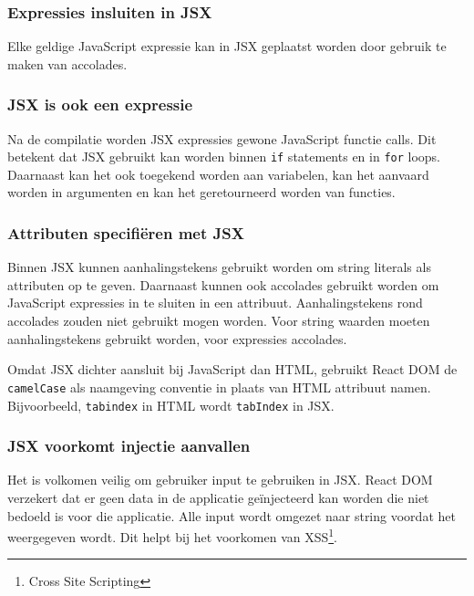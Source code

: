 \subsubsection{Expressies insluiten in JSX}

Elke geldige JavaScript expressie kan in JSX geplaatst worden door gebruik te maken van accolades. \autocite{React2019a}

\subsubsection{JSX is ook een expressie}

Na de compilatie worden JSX expressies gewone JavaScript functie calls. Dit betekent dat JSX gebruikt kan worden binnen \texttt{if} statements en in \texttt{for} loops. Daarnaast kan het ook toegekend worden aan variabelen, kan het aanvaard worden in argumenten en kan het geretourneerd worden van functies. \autocite{React2019a}

\subsubsection{Attributen specifiëren met JSX}

Binnen JSX kunnen aanhalingstekens gebruikt worden om string literals als attributen op te geven. Daarnaast kunnen ook accolades gebruikt worden om JavaScript expressies in te sluiten in een attribuut. Aanhalingstekens rond accolades zouden niet gebruikt mogen worden. Voor string waarden moeten aanhalingstekens gebruikt worden, voor expressies accolades.  \autocite{React2019a}

Omdat JSX dichter aansluit bij JavaScript dan HTML, gebruikt React DOM de \texttt{camelCase} als naamgeving conventie in plaats van HTML attribuut namen. Bijvoorbeeld, \texttt{tabindex} in HTML wordt \texttt{tabIndex} in JSX. \autocite{React2019a}

\subsubsection{JSX voorkomt  injectie aanvallen}

Het is volkomen veilig om gebruiker input te gebruiken in JSX. React DOM verzekert dat er geen data in de applicatie geïnjecteerd kan worden die niet bedoeld is voor die applicatie. Alle input wordt omgezet naar string voordat het weergegeven wordt. Dit helpt bij het voorkomen van XSS\footnote{Cross Site Scripting}. \autocite{React2019a}

